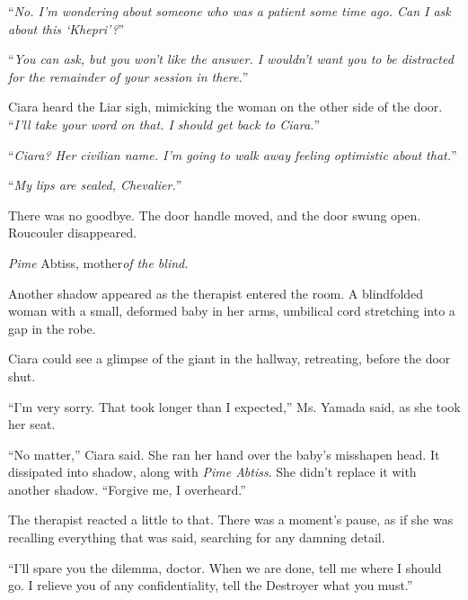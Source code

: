 ``\emph{No.  I'm wondering about someone who was a patient some time ago.  Can I ask about this `Khepri'?}''



``\emph{You can ask, but you won't like the answer.  I wouldn't want you to be distracted for the remainder of your session in there.}''



Ciara heard the Liar sigh, mimicking the woman on the other side of the door.  ``\emph{I'll take your word on that.  I should get back to Ciara.}''



``\emph{Ciara?  Her civilian name.  I'm going to walk away feeling optimistic about that.}''



``\emph{My lips are sealed, Chevalier.}''



There was no goodbye.  The door handle moved, and the door swung open.  Roucouler disappeared.



\emph{Pime} Abtiss, mother\emph{of the blind.}



Another shadow appeared as the therapist entered the room.  A blindfolded woman with a small, deformed baby in her arms, umbilical cord stretching into a gap in the robe.



Ciara could see a glimpse of the giant in the hallway, retreating, before the door shut.



``I'm very sorry.  That took longer than I expected,'' Ms. Yamada said, as she took her seat.



``No matter,'' Ciara said.  She ran her hand over the baby's misshapen head.  It dissipated into shadow, along with \emph{Pime Abtiss}.  She didn't replace it with another shadow.  ``Forgive me, I overheard.''



The therapist reacted a little to that.  There was a moment's pause, as if she was recalling everything that was said, searching for any damning detail.



``I'll spare you the dilemma, doctor.  When we are done, tell me where I should go.  I relieve you of any confidentiality, tell the Destroyer what you must.''



